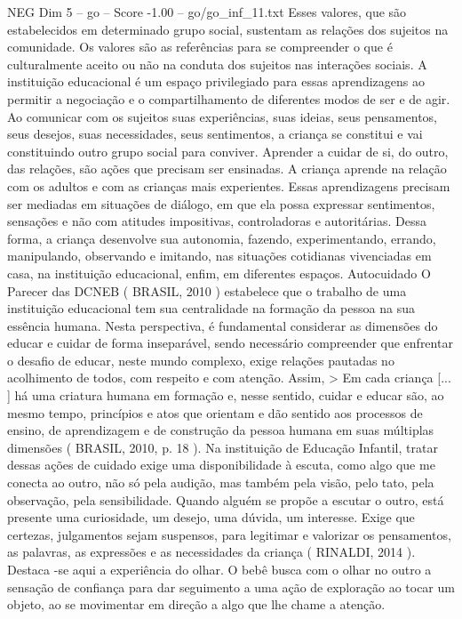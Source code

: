 \begin{textsample}{NEG Dim 5 – go – Score -1.00 – go/go\_inf\_11.txt}
Esses valores, que são estabelecidos em determinado grupo social, sustentam as relações dos sujeitos na comunidade.
Os valores são as referências para se compreender o que é culturalmente aceito ou não na conduta dos sujeitos nas interações sociais.
A instituição educacional é um espaço privilegiado para essas aprendizagens ao permitir a negociação e o compartilhamento de diferentes modos de ser e de agir.
Ao comunicar com os sujeitos suas experiências, suas ideias, seus pensamentos, seus desejos, suas necessidades, seus sentimentos, a criança se constitui e vai constituindo outro grupo social para conviver.
Aprender a cuidar de si, do outro, das relações, são ações que precisam ser ensinadas.
A criança aprende na relação com os adultos e com as crianças mais experientes.
Essas aprendizagens precisam ser mediadas em situações de diálogo, em que ela possa expressar sentimentos, sensações e não com atitudes impositivas, controladoras e autoritárias.
Dessa forma, a criança desenvolve sua autonomia, fazendo, experimentando, errando, manipulando, observando e imitando, nas situações cotidianas vivenciadas em casa, na instituição educacional, enfim, em diferentes espaços.
Autocuidado O Parecer das DCNEB ( BRASIL, 2010 ) estabelece que o trabalho de uma instituição educacional tem sua centralidade na formação da pessoa na sua essência humana.
Nesta perspectiva, é fundamental considerar as dimensões do educar e cuidar de forma inseparável, sendo necessário compreender que enfrentar o desafio de educar, neste mundo complexo, exige relações pautadas no acolhimento de todos, com respeito e com atenção.
Assim, > Em cada criança [... ] há uma criatura humana em formação e, nesse sentido, cuidar e educar são, ao mesmo tempo, princípios e atos que orientam e dão sentido aos processos de ensino, de aprendizagem e de construção da pessoa humana em suas múltiplas dimensões ( BRASIL, 2010, p. 18 ).
Na instituição de Educação Infantil, tratar dessas ações de cuidado exige uma disponibilidade à escuta, como algo que me conecta ao outro, não só pela audição, mas também pela visão, pelo tato, pela observação, pela sensibilidade.
Quando alguém se propõe a escutar o outro, está presente uma curiosidade, um desejo, uma dúvida, um interesse.
Exige que certezas, julgamentos sejam suspensos, para legitimar e valorizar os pensamentos, as palavras, as expressões e as necessidades da criança ( RINALDI, 2014 ).
Destaca -se aqui a experiência do olhar.
O bebê busca com o olhar no outro a sensação de confiança para dar seguimento a uma ação de exploração ao tocar um objeto, ao se movimentar em direção a algo que lhe chame a atenção.

\end{textsample}
